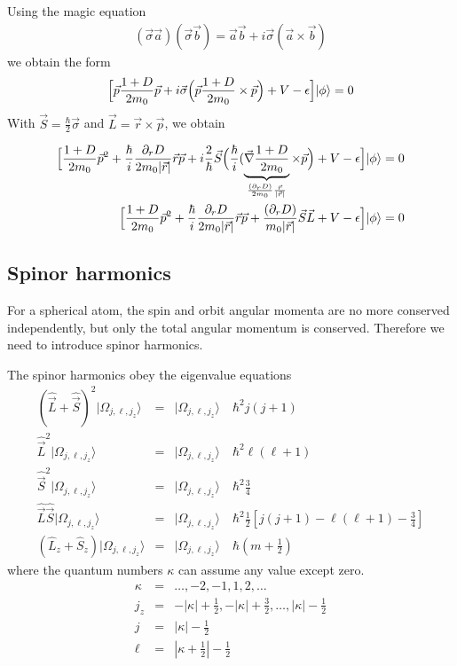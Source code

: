 \documentclass[11pt,a4paper]{report}
\begin{document}
Using the magic equation
\begin{eqnarray}
(\vec{\sigma}\vec{a})(\vec{\sigma}\vec{b})
=\vec{a}\vec{b}+i\vec{\sigma}(\vec{a}\times\vec{b})
\end{eqnarray}
we obtain the form
\begin{eqnarray}
\Bigl[\vec{p} \frac{1+D}{2m_0}\vec{p} 
+i\vec{\sigma} 
\Bigl(\vec{p} \frac{1+D}{2m_0}\times\vec{p} \Bigr)
+V-\epsilon\Bigr]|\phi\rangle=0
\end{eqnarray}
With $\vec{S}=\frac{\hbar}{2}\vec{\sigma}$ and
$\vec{L}=\vec{r}\times\vec{p}$, we obtain

\begin{eqnarray}
\Bigl[
\frac{1+D}{2m_0}\vec{p}^2 
+\frac{\hbar}{i}\frac{\partial_rD}{2m_0|\vec{r}|}\vec{r}\vec{p} 
+i\frac{2}{\hbar}\vec{S} 
\Bigl(\frac{\hbar}{i}(\underbrace{\vec{\nabla}\frac{1+D}{2m_0}}
_{\frac{(\partial_r D)}{2m_0}\frac{\vec{r}}{|\vec{r}|}}\times\vec{p} \Bigr)
+V-\epsilon\Bigr]|\phi\rangle=0
\nonumber\\
\Bigl[
\frac{1+D}{2m_0}\vec{p}^2 
+\frac{\hbar}{i}\frac{\partial_rD}{2m_0|\vec{r}|}\vec{r}\vec{p} 
+ \frac{(\partial_r D)}{m_0|\vec{r}|}\vec{S}\vec{L}
+V-\epsilon\Bigr]|\phi\rangle=0
\nonumber\\
\end{eqnarray}


\subsection{Spinor harmonics}
For a spherical atom, the spin and orbit angular momenta are no more
conserved independently, but only the total angular momentum is
conserved. Therefore we need to introduce spinor harmonics.

The spinor harmonics obey the eigenvalue equations
\begin{eqnarray*}
\left(\hat{\vec{L}}+\hat{\vec{S}}\right)^2|\Omega_{j,\ell,j_z}\rangle
&=&|\Omega_{j,\ell,j_z}\rangle\quad\hbar^2j(j+1)
\\
\hat{\vec{L}}^2|\Omega_{j,\ell,j_z}\rangle
&=&|\Omega_{j,\ell,j_z}\rangle\quad\hbar^2\ell(\ell+1)
\\
\hat{\vec{S}}^2|\Omega_{j,\ell,j_z}\rangle
&=&|\Omega_{j,\ell,j_z}\rangle\quad\hbar^2\frac{3}{4}
\\
\hat{\vec{L}}\hat{\vec{S}}|\Omega_{j,\ell,j_z}\rangle
&=&|\Omega_{j,\ell,j_z}\rangle\quad\hbar^2\frac{1}{2}\left[j(j+1)-\ell(\ell+1)-\frac{3}{4}\right]
\\
\left(\hat{L}_z+\hat{S}_z\right)|\Omega_{j,\ell,j_z}\rangle
&=&|\Omega_{j,\ell,j_z}\rangle\quad\hbar(m+\frac{1}{2})
\end{eqnarray*}
where the quantum numbers $\kappa$ can assume any value except zero.
\begin{eqnarray}
\kappa&=&\ldots,-2,-1,1,2,\ldots
\\
j_z&=&-|\kappa|+\frac{1}{2},-|\kappa|+\frac{3}{2},\ldots,|\kappa|-\frac{1}{2}
\\
j&=& |\kappa|-\frac{1}{2}
\\
\ell&=&|\kappa+\frac{1}{2}|-\frac{1}{2}
\end{eqnarray}
\end{document}
